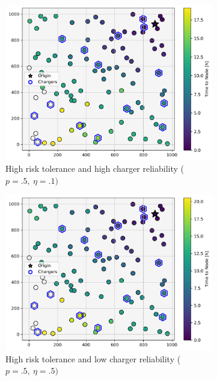 \begin{figure}[H]
	\centering
	\begin{subfigure}{.5\linewidth}
		\centering\includegraphics[width = \linewidth]{figs/parameter_factorial_00.png}
		\captionsetup{width=.8\linewidth}
		\caption{High risk tolerance and high charger reliability ($p = .5,\ \eta = .1)$}
	\end{subfigure}%
	\begin{subfigure}{.5\linewidth}
		\centering\includegraphics[width = \linewidth]{figs/parameter_factorial_01.png}
		\captionsetup{width=.8\linewidth}
		\caption{High risk tolerance and low charger reliability ($p = .5,\ \eta = .5)$}
	\end{subfigure}
	\begin{subfigure}{.5\linewidth}

\end{subfigure}
\end{figure}
